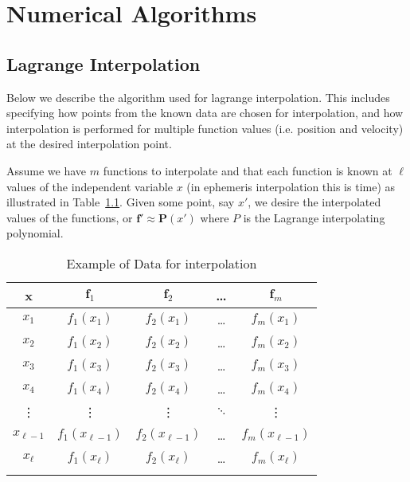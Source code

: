 \chapter{Numerical Algorithms} \label{Ch:NumericalAlgorithms}

\section{Lagrange Interpolation}

Below we describe the algorithm used for lagrange interpolation.
This includes specifying how points  from the known data are chosen
for interpolation, and how interpolation is performed for multiple
function values (i.e. position and velocity) at the desired
interpolation point.

Assume we have $m$ functions to interpolate and that each function
is known at $\ell$ values of the independent variable $x$ (in
ephemeris interpolation this is time) as illustrated in
Table~\ref{Table:InterpolationData}. Given some point, say $x'$, we
desire the interpolated values of the functions, or $\mathbf{f}'
\approx \mathbf{P}(x')$ where $P$ is the Lagrange interpolating
polynomial.

%
\begin{table}[ht] \centering
\caption{Example of Data for interpolation}
 \begin{tabular}{ccccc}  \hline \hline
         x & $\mathbf{f}_1$ & $\mathbf{f}_2$ & \dots & $\mathbf{f}_m$ \\ \hline
         $x_1$ & $f_1(x_1)$ &  $f_2(x_1)$ &  \dots & $f_m(x_1)$\\
         $x_2$ & $f_1(x_2)$ &  $f_2(x_2)$ &  \dots &$f_m(x_2)$\\
         $x_3$ & $f_1(x_3)$ &  $f_2(x_3)$ &  \dots &$f_m(x_3)$\\
         $x_4$ & $f_1(x_4)$ &  $f_2(x_4)$ &  \dots &$f_m(x_4)$\\
         \vdots   & \vdots &   \vdots &  $\ddots$ & \vdots\\
         $x_{\ell-1}$ & $f_1(x_{\ell-1})$ &  $f_2(x_{\ell-1})$ & \dots & $f_m(x_{\ell-1})$\\
         $x_{\ell}$ & $f_1(x_\ell)$ &  $f_2(x_\ell)$ & \dots & $f_m(x_\ell)$\\
         \hline \hline
         \label{Table:InterpolationData}
 \end{tabular}
 \end{table}

